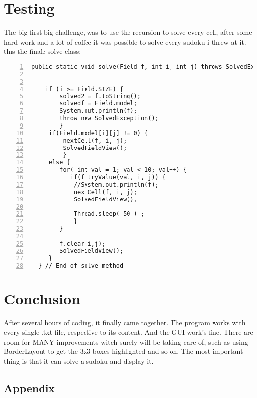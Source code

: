 \documentclass{article}
\begin{document}
\section{Testing}\label{sec:test}
The big first big challenge, was to use the recursion to solve every cell, after some hard work and a lot of coffee it was possible to solve every sudoku i threw at it.
this the finale solve class:
\begin{lstlisting}[language=Tex, basicstyle=\footnotesize\ttfamily,
numbers=left,stepnumber=1,frame=lrtb, morekeywords={assert}, tabsize=4,
breaklines=true]
public static void solve(Field f, int i, int j) throws SolvedException, InterruptedException {

	   
    if (i >= Field.SIZE) {
    	solved2 = f.toString();
    	solvedf = Field.model; 
    	System.out.println(f);
        throw new SolvedException();
        }
     if(Field.model[i][j] != 0) {
    	 nextCell(f, i, j);
    	 SolvedFieldView();
    	 }     
     else {
        for( int val = 1; val < 10; val++) {
           if(f.tryValue(val, i, j)) {
        	//System.out.println(f); 
        	nextCell(f, i, j);
        	SolvedFieldView();
        	
        	Thread.sleep( 50 ) ;
        	}
        }

        f.clear(i,j);
        SolvedFieldView();
     }
  } // End of solve method   
\end{lstlisting}  

\newpage

\section{Conclusion}\label{sec:con}
After several hours of coding, it finally came together. The program works with every single .txt file, respective to its content. And the GUI work's fine. There are room for MANY improvements witch surely will be taking care of, such as using BorderLayout to get the 3x3 boxes highlighted and so on. The most important thing is that it can solve a sudoku and display it.  

\newpage

\appendix

\begin{center}
 \section*{Appendix}
\end{center}
\end{document}
